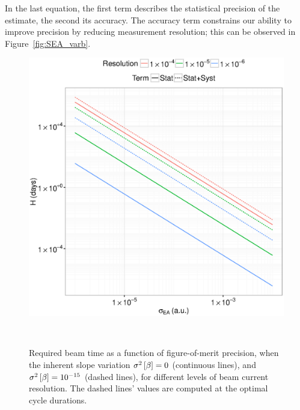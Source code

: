 \documentclass{article}
\begin{document}
In the last equation, the first term describes the statistical precision of the estimate, the second its accuracy. The accuracy term constrains our ability to improve precision by reducing measurement resolution; this can be observed in Figure~\ref{fig:SEA_varb}.

\begin{figure}[h]
	\centering
	\begin{minipage}{.5\textwidth}
		\centering
		\includegraphics[scale=.5]{Polish_BeamTime_Plot.eps}
		\caption{Required beam time as a function of figure-of-merit precision, when the inherent slope variation $\v{\slp} = 0$ (continuous lines), and $\v{\slp} =  10^{-15}$ (dashed lines), for different levels of beam current resolution. The dashed lines' values are computed at the optimal cycle durations.}
	\end{minipage}~~
	\begin{minipage}{.5\textwidth}
		\centering

\end{minipage}
\end{figure}
\end{document}
